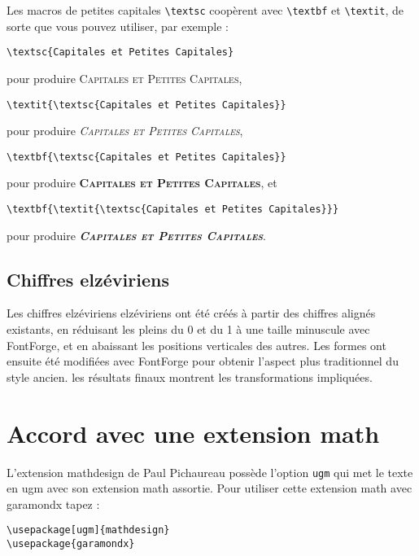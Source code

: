\documentclass[12pt,english,french]{article}
\newcommand{\mnu}[1]{\textsf{#1}}
\newcommand{\cmd}[1]{\texttt{#1}}
\begin{document}
Les macros de petites capitales \verb+\textsc+ coopèrent avec \verb+\textbf+ et \verb+\textit+, de sorte que vous pouvez utiliser, par exemple :

\begin{verbatim}
\textsc{Capitales et Petites Capitales}
\end{verbatim}
pour produire \textsc{Capitales et Petites Capitales},

\begin{verbatim}
\textit{\textsc{Capitales et Petites Capitales}}
\end{verbatim}
pour produire \textit{\textsc{Capitales et Petites Capitales}},

\begin{verbatim}
\textbf{\textsc{Capitales et Petites Capitales}}
\end{verbatim}
pour produire \textbf{\textsc{Capitales et Petites Capitales}}, et

\begin{verbatim}
\textbf{\textit{\textsc{Capitales et Petites Capitales}}}
\end{verbatim}
pour produire \textbf{\textit{\textsc{Capitales et Petites Capitales}}}.

\subsection{Chiffres elzéviriens}

Les chiffres elzéviriens elzéviriens ont été créés à partir des chiffres alignés existants, en réduisant les pleins du 0 et du 1 à une taille minuscule avec FontForge, et en abaissant les positions verticales des autres. Les formes ont ensuite été modifiées avec FontForge pour obtenir l'aspect plus traditionnel du style ancien. les résultats finaux montrent les transformations impliquées.

\section{Accord avec une extension math}

L'extension \mnu{mathdesign} de Paul Pichaureau possède l'option \cmd{ugm} qui met le texte en \mnu{ugm} avec son extension math assortie. Pour utiliser cette extension math avec \mnu{garamondx} tapez :

\begin{verbatim}
\usepackage[ugm]{mathdesign}
\usepackage{garamondx}
\end{verbatim}
\end{document}
